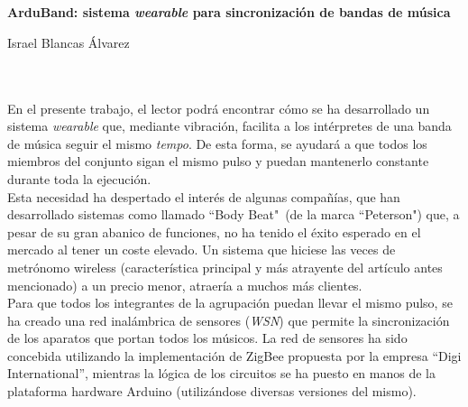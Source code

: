 \chapter*{}





\cleardoublepage
\thispagestyle{empty}

\begin{center}
{\large\bfseries ArduBand: sistema  \textit{wearable} para sincronización de bandas de música}\\
\end{center}
\begin{center}
Israel Blancas Álvarez\\
\end{center}

\\

\vspace{0.7cm}
\\
En el presente trabajo, el lector podrá encontrar cómo se ha desarrollado un sistema
\textit{wearable} que, mediante vibración, facilita a los intérpretes de una banda de
música seguir el mismo \textit{tempo}. De esta forma, se ayudará a que todos los miembros del conjunto
sigan el mismo pulso y puedan mantenerlo constante durante toda la ejecución.\\

Esta necesidad ha despertado el interés de algunas compañías, que han desarrollado sistemas como
llamado ``Body Beat"\ (de la marca ``Peterson") que, a pesar de su gran abanico de funciones,
no ha tenido el éxito esperado en el mercado al tener un coste elevado. Un sistema que hiciese las
veces de metrónomo wireless (característica principal y más atrayente del artículo antes mencionado)
a un precio menor, atraería a muchos más clientes.\\

Para que todos los integrantes de la agrupación puedan llevar el mismo pulso, se ha creado una red
inalámbrica de sensores (\textit{WSN}) que permite la sincronización de los aparatos que portan todos los músicos.
La red de sensores ha sido concebida utilizando la implementación de ZigBee propuesta por la empresa “Digi
International”, mientras la lógica de los circuitos se ha puesto en manos de la plataforma hardware Arduino
(utilizándose diversas versiones del mismo).\\

